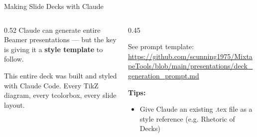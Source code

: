 \documentclass[aspectratio=169, 11pt]{beamer}
\newcommand{\emphgold}[1]{\alert{\textbf{#1}}}
\begin{document}
\begin{frame}{Making Slide Decks with Claude}
\begin{columns}[T]
\begin{column}{0.52\textwidth}
  {\small Claude can generate entire Beamer presentations --- but the key is giving it a \emphgold{style template} to follow.}
  \vspace{0.1cm}
  \vspace{0.15cm}
  \begin{keyinsight}
    This entire deck was built and styled with Claude Code. Every TikZ diagram, every tcolorbox, every slide layout.
  \end{keyinsight}
\end{column}
\begin{column}{0.45\textwidth}
  \begin{quotebox}
    See prompt template: \url{https://github.com/scunning1975/MixtapeTools/blob/main/presentations/deck_generation_prompt.md}
  
  \end{quotebox}
  \vspace{0.1cm}
  {\small\bfseries\color{navy} Tips:}
  \begin{itemize}\small
    \item Give Claude an existing .tex file as a style reference (e.g. Rhetoric of Decks)
   \end{itemize}
\end{column}
\end{columns}
\end{frame}
\end{document}
